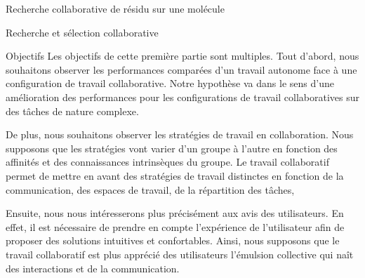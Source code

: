 \documentclass[myfrancais]{mythesis}
\begin{document}
\begin{mychapter}{Recherche collaborative de résidu sur une molécule}
\begin{mysection}{Recherche et sélection collaborative}
\begin{mysubsection}{Objectifs}
				Les objectifs de cette première partie sont multiples.
				Tout d'abord, nous souhaitons observer les performances comparées d'un travail autonome face à une configuration de travail collaborative.
				Notre hypothèse va dans le sens d'une amélioration des performances pour les configurations de travail collaboratives sur des tâches de nature complexe.

				De plus, nous souhaitons observer les stratégies de travail en collaboration.
				Nous supposons que les stratégies vont varier d'un groupe à l'autre en fonction des affinités et des connaissances intrinsèques du groupe.
				Le travail collaboratif permet de mettre en avant des stratégies de travail distinctes en fonction de la communication, des espaces de travail, de la répartition des tâches, \myetc

				Ensuite, nous nous intéresserons plus précisément aux avis des utilisateurs.
				En effet, il est nécessaire de prendre en compte l'expérience de l'utilisateur afin de proposer des solutions intuitives et confortables.
				Ainsi, nous supposons que le travail collaboratif est plus apprécié des utilisateurs l'émulsion collective qui naît des interactions et de la communication.


\end{mysubsection}
\end{mysection}
\end{mychapter}
\end{document}
